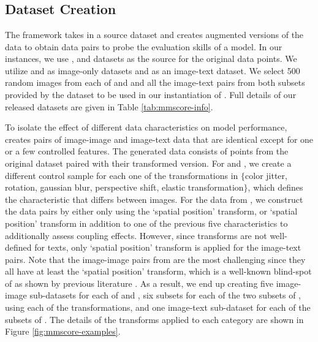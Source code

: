 
\vspace{-2mm}
\section{\mmscore{}}
\subsection{Dataset Creation}
The \mmscore{} framework takes in a source dataset and creates augmented versions of the data to obtain data pairs to probe the evaluation skills of a model. 
In our instances, we use \coco{} \cite{lin2014microsoft}, \imagenet{} \cite{deng2009imagenet} and \wu{} \cite{kamath2023s} datasets as the source for the original data points. We utilize \coco{} and \imagenet{} as image-only datasets and \wu{} as an image-text dataset. We select 500 random images from each of \coco{} and \imagenet{} and all the image-text pairs from both subsets provided by the \wu{} dataset to be used in our instantiation of \mmscore. Full details of our released datasets are given in Table \ref{tab:mmscore-info}.

To isolate the effect of different data characteristics on model performance,
\mmscore{} creates pairs of image-image and image-text data that are identical except for one or a few controlled features. The generated data consists of points from the original dataset paired with their transformed version.
For \coco{} and \imagenet, we create a different control sample for each one of the transformations in $\{$color jitter, rotation, gaussian blur, perspective shift, elastic transformation$\}$, which defines the characteristic that differs between images. For the data from \wu{}, we construct the data pairs by either only using the `spatial position' transform, or `spatial position' transform in addition to one of the previous five characteristics to additionally assess coupling effects. 
However, since transforms are not well-defined for texts, only `spatial position' transform is applied for the image-text pairs. Note that the image-image pairs from \wu{} are the most challenging since they all have at least the `spatial position' transform, which is a well-known blind-spot of \modelss{} as shown by previous literature \cite{kamath2023s, wang2024picture}. As a result, we end up creating five image-image sub-datasets for each of \coco{} and \imagenet, six subsets for each of the two subsets of \wu{}, using each of the transformations, and one image-text sub-dataset for each of the subsets of \wu{}. The details of the transforms applied to each category are shown in Figure \ref{fig:mmscore-examples}.

